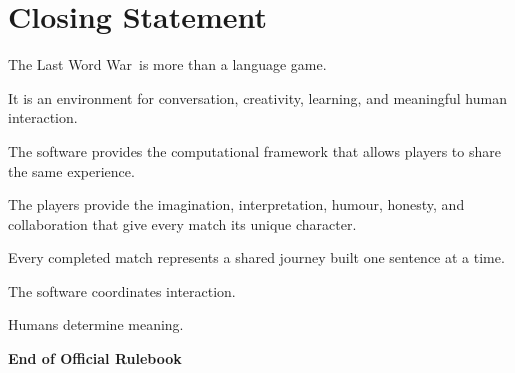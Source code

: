 \documentclass[11pt,a4paper]{article}
\begin{document}
\section{Closing Statement}

The Last Word War\texttrademark\ is more than a language game.

It is an environment for conversation, creativity, learning, and meaningful human interaction.

The software provides the computational framework that allows players to share the same experience.

The players provide the imagination, interpretation, humour, honesty, and collaboration that give every match its unique character.

Every completed match represents a shared journey built one sentence at a time.

The software coordinates interaction.

Humans determine meaning.

\vspace{1cm}

\begin{center}
\Large
\textbf{End of Official Rulebook}
\end{center}
\end{document}
